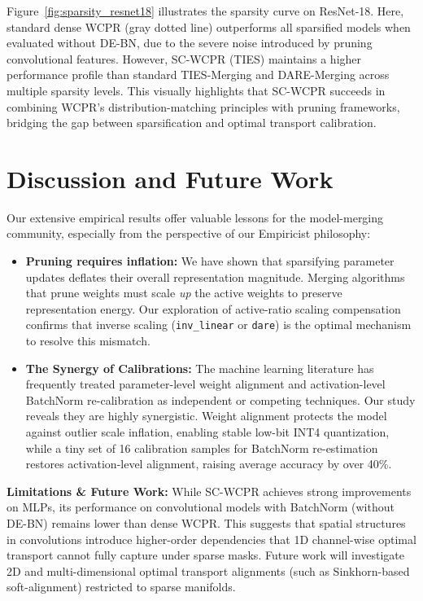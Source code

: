 \documentclass{article}
\theoremstyle{plain}
\theoremstyle{definition}
\theoremstyle{remark}
\begin{document}
Figure~\ref{fig:sparsity_resnet18} illustrates the sparsity curve on ResNet-18. Here, standard dense WCPR (gray dotted line) outperforms all sparsified models when evaluated without DE-BN, due to the severe noise introduced by pruning convolutional features. However, SC-WCPR (TIES) maintains a higher performance profile than standard TIES-Merging and DARE-Merging across multiple sparsity levels. This visually highlights that SC-WCPR succeeds in combining WCPR's distribution-matching principles with pruning frameworks, bridging the gap between sparsification and optimal transport calibration.

\section{Discussion and Future Work}
\label{sec:discussion}

Our extensive empirical results offer valuable lessons for the model-merging community, especially from the perspective of our Empiricist philosophy:
\begin{itemize}
  \item \textbf{Pruning requires inflation:} We have shown that sparsifying parameter updates deflates their overall representation magnitude. Merging algorithms that prune weights must scale \emph{up} the active weights to preserve representation energy. Our exploration of active-ratio scaling compensation confirms that inverse scaling (\texttt{inv\_linear} or \texttt{dare}) is the optimal mechanism to resolve this mismatch.
  \item \textbf{The Synergy of Calibrations:} The machine learning literature has frequently treated parameter-level weight alignment and activation-level BatchNorm re-calibration as independent or competing techniques. Our study reveals they are highly synergistic. Weight alignment protects the model against outlier scale inflation, enabling stable low-bit INT4 quantization, while a tiny set of 16 calibration samples for BatchNorm re-estimation restores activation-level alignment, raising average accuracy by over 40\%. 
\end{itemize} 

\textbf{Limitations \& Future Work:} While SC-WCPR achieves strong improvements on MLPs, its performance on convolutional models with BatchNorm (without DE-BN) remains lower than dense WCPR. This suggests that spatial structures in convolutions introduce higher-order dependencies that 1D channel-wise optimal transport cannot fully capture under sparse masks. Future work will investigate 2D and multi-dimensional optimal transport alignments (such as Sinkhorn-based soft-alignment) restricted to sparse manifolds.
\end{document}
